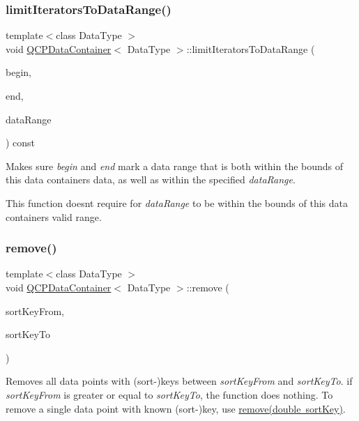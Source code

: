 \subsubsection{\texorpdfstring{limit\+Iterators\+To\+Data\+Range()}{limitIteratorsToDataRange()}}
{\footnotesize\ttfamily template$<$class Data\+Type $>$ \\
void \mbox{\hyperlink{class_q_c_p_data_container}{Q\+C\+P\+Data\+Container}}$<$ Data\+Type $>$\+::limit\+Iterators\+To\+Data\+Range (\begin{DoxyParamCaption}\item[{const\+\_\+iterator \&}]{begin,  }\item[{const\+\_\+iterator \&}]{end,  }\item[{const \mbox{\hyperlink{class_q_c_p_data_range}{Q\+C\+P\+Data\+Range}} \&}]{data\+Range }\end{DoxyParamCaption}) const}

Makes sure {\itshape begin} and {\itshape end} mark a data range that is both within the bounds of this data container\textquotesingle{}s data, as well as within the specified {\itshape data\+Range}.

This function doesn\textquotesingle{}t require for {\itshape data\+Range} to be within the bounds of this data container\textquotesingle{}s valid range. \mbox{\label{class_q_c_p_data_container_ae5f569a120648b167efa78835f12fd38}} 
\subsubsection{\texorpdfstring{remove()}{remove()}\hspace{0.1cm}{\footnotesize\ttfamily [1/2]}}
{\footnotesize\ttfamily template$<$class Data\+Type $>$ \\
void \mbox{\hyperlink{class_q_c_p_data_container}{Q\+C\+P\+Data\+Container}}$<$ Data\+Type $>$\+::remove (\begin{DoxyParamCaption}\item[{double}]{sort\+Key\+From,  }\item[{double}]{sort\+Key\+To }\end{DoxyParamCaption})}

Removes all data points with (sort-\/)keys between {\itshape sort\+Key\+From} and {\itshape sort\+Key\+To}. if {\itshape sort\+Key\+From} is greater or equal to {\itshape sort\+Key\+To}, the function does nothing. To remove a single data point with known (sort-\/)key, use \mbox{\hyperlink{class_q_c_p_data_container_a2dbded7f0732bacf9db48fdfbbb620bc}{remove(double sort\+Key)}}.


